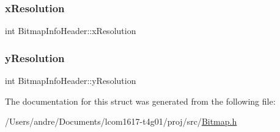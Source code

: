 \subsubsection{\texorpdfstring{x\+Resolution}{xResolution}}
{\footnotesize\ttfamily int Bitmap\+Info\+Header\+::x\+Resolution}

\hypertarget{struct_bitmap_info_header_af2fadf9c216cc9f3ce401096e35be1b7}{}\label{struct_bitmap_info_header_af2fadf9c216cc9f3ce401096e35be1b7} 
\subsubsection{\texorpdfstring{y\+Resolution}{yResolution}}
{\footnotesize\ttfamily int Bitmap\+Info\+Header\+::y\+Resolution}



The documentation for this struct was generated from the following file\+:\begin{DoxyCompactItemize}
\item 
/\+Users/andre/\+Documents/lcom1617-\/t4g01/proj/src/\hyperlink{_bitmap_8h}{Bitmap.\+h}\end{DoxyCompactItemize}
